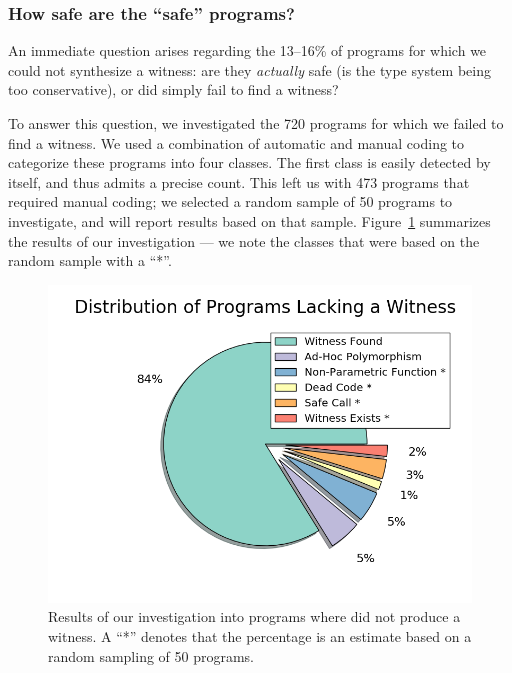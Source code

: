 \subsubsection{How safe are the ``safe'' programs?}
\label{sec:how-safe}

An immediate question arises regarding the 13--16\% of programs for
which we could not synthesize a witness:
%
are they \emph{actually} safe (\ie is the type system being too conservative),
%
or did \toolname simply fail to find a witness?
%

To answer this question, we investigated the 720 \ucsdbench programs for
which we failed to find a witness.
%
We used a combination of automatic and manual coding to categorize these
programs into four classes.
%
The first class is easily detected by \toolname itself, and thus admits
a precise count.
%
This left us with 473 programs that required manual coding; we selected
a random sample of 50 programs to investigate, and will report results
based on that sample.
%
Figure~\ref{fig:no-witness} summarizes the results of our investigation ---
we note the classes that were based on the random sample with a ``*''.


\begin{figure}[t]
\includegraphics[width=0.7\linewidth]{distrib_ext.png}
\vspace{-0.75cm}
\caption{Results of our investigation into programs where \toolname
  did not produce a witness. A ``*'' denotes that the percentage is an
  estimate based on a random sampling of 50 programs.}
\label{fig:no-witness}
\end{figure}

